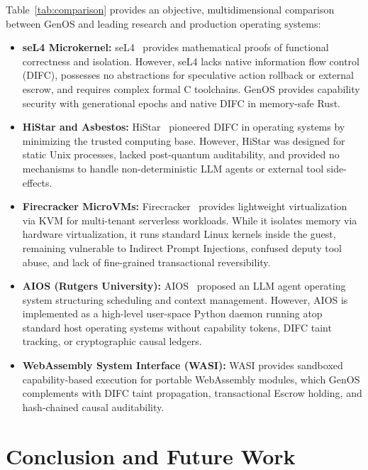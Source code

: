 \documentclass[10pt,journal,compsoc]{IEEEtran}
\theoremstyle{definition}
\begin{document}
Table~\ref{tab:comparison} provides an objective, multidimensional comparison between GenOS and leading research and production operating systems:
\begin{itemize}
    \item \textbf{seL4 Microkernel:} seL4~\cite{klein2009sel4} provides mathematical proofs of functional correctness and isolation. However, seL4 lacks native information flow control (DIFC), possesses no abstractions for speculative action rollback or external escrow, and requires complex formal C toolchains. GenOS provides capability security with generational epochs and native DIFC in memory-safe Rust.
    \item \textbf{HiStar and Asbestos:} HiStar~\cite{zeldovich2006making} pioneered DIFC in operating systems by minimizing the trusted computing base. However, HiStar was designed for static Unix processes, lacked post-quantum auditability, and provided no mechanisms to handle non-deterministic LLM agents or external tool side-effects.
    \item \textbf{Firecracker MicroVMs:} Firecracker~\cite{agache2020firecracker} provides lightweight virtualization via KVM for multi-tenant serverless workloads. While it isolates memory via hardware virtualization, it runs standard Linux kernels inside the guest, remaining vulnerable to Indirect Prompt Injections, confused deputy tool abuse, and lack of fine-grained transactional reversibility.
    \item \textbf{AIOS (Rutgers University):} AIOS~\cite{mei2024aios} proposed an LLM agent operating system structuring scheduling and context management. However, AIOS is implemented as a high-level user-space Python daemon running atop standard host operating systems without capability tokens, DIFC taint tracking, or cryptographic causal ledgers.
    \item \textbf{WebAssembly System Interface (WASI):} WASI provides sandboxed capability-based execution for portable WebAssembly modules, which GenOS complements with DIFC taint propagation, transactional Escrow holding, and hash-chained causal auditability.
\end{itemize}

\section{Conclusion and Future Work}
\label{sec:conclusion}
\end{document}

